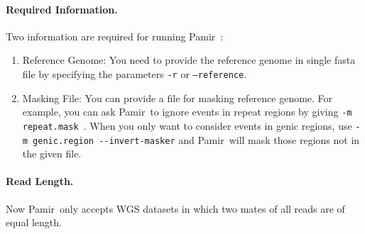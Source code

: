 \documentclass{article}
\newcommand{\toolName}{Pamir~}
\begin{document}
\paragraph{Required Information.} Two information are required for running \toolName:
\begin{enumerate}
\item Reference Genome: You need to provide the reference genome in single fasta file by specifying the parameters \texttt{-r} or \texttt{--reference}.

\item Masking File: You can provide a file for masking reference genome. For example,  you can ask \toolName to ignore events in repeat regions by giving \texttt{-m repeat.mask }. When you only want to consider events in genic regions, use  \texttt{-m genic.region -{}-invert-masker} and \toolName will mask those regions not in the given file.

\end{enumerate}

\paragraph{Read Length.} Now \toolName only accepts WGS datasets in which two mates of all reads are of equal length.
\end{document}
